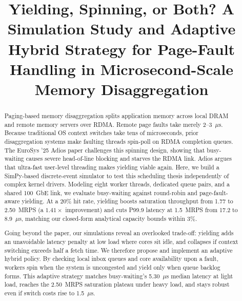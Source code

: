 \documentclass[conference]{IEEEtran}
\begin{document}
\title{Yielding, Spinning, or Both? A Simulation Study and Adaptive Hybrid Strategy for Page-Fault Handling in Microsecond-Scale Memory Disaggregation}

\author{
\vspace{0.1em}
\vspace{0.4em}
}

\maketitle

\begin{abstract}
Paging-based memory disaggregation splits application memory across local DRAM and remote memory servers over RDMA. Remote page faults take merely 2--3~$\mu$s. Because traditional OS context switches take tens of microseconds, prior disaggregation systems make faulting threads spin-poll on RDMA completion queues. The EuroSys '25 Adios paper challenges this spinning design, showing that busy-waiting causes severe head-of-line blocking and starves the RDMA link. Adios argues that ultra-fast user-level threading makes yielding viable again. Here, we build a SimPy-based discrete-event simulator to test this scheduling thesis independently of complex kernel drivers. Modeling eight worker threads, dedicated queue pairs, and a shared 100~GbE link, we evaluate busy-waiting against round-robin and page-fault-aware yielding. At a 20\% hit rate, yielding boosts saturation throughput from 1.77 to 2.50~MRPS (a $1.41\times$ improvement) and cuts P99.9 latency at 1.5~MRPS from 17.2 to 8.9~$\mu$s, matching our closed-form analytical capacity bounds within 3\%.

Going beyond the paper, our simulations reveal an overlooked trade-off: yielding adds an unavoidable latency penalty at low load where cores sit idle, and collapses if context switching exceeds half a fetch time. We therefore propose and implement an adaptive hybrid policy. By checking local inbox queues and core availability upon a fault, workers spin when the system is uncongested and yield only when queue backlog forms. This adaptive strategy matches busy-waiting's 5.30~$\mu$s median latency at light load, reaches the 2.50~MRPS saturation plateau under heavy load, and stays robust even if switch costs rise to 1.5~$\mu$s.
\end{abstract}
\end{document}
